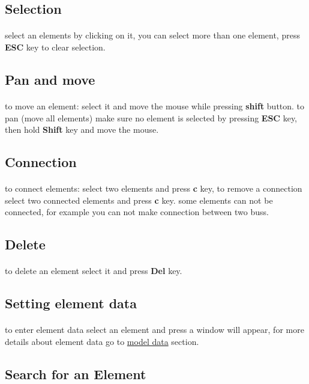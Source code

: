 \documentclass{article}
\begin{document}
\subsection{Selection}
\paragraph{}select  an elements by clicking on it, you can select more than one element, press \textbf{ESC} key to clear selection.
\subsection{Pan and move}
\paragraph{}to move an element: select it and move the mouse while pressing \textbf{shift} button. to pan (move all elements) make sure no element is selected by pressing \textbf{ESC} key, then hold \textbf{Shift} key 
and move the mouse.
\subsection{Connection}
\paragraph{}to connect elements: select two elements and press \textbf{c} key, to remove a connection select two connected elements and press \textbf{c} key. some elements can not be connected, for example you can not make connection between two buss.
\subsection{Delete}
\paragraph{}
to delete an element select it and press \textbf{Del} key.
\subsection{Setting element data}
\paragraph{}to enter element data select an element and press a window will appear, for more details about element data go to \hyperref[sec:modeldata]{model data} section.
\subsection{Search for an Element }
\end{document}
